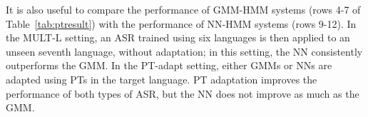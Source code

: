 It is also useful to compare the performance of GMM-HMM systems (rows
4-7 of Table~\ref{tab:ptresult}) with the performance of NN-HMM
systems (rows 9-12).  In the {\sc MULT-L} setting, an ASR trained
using six languages is then applied to an unseen seventh language,
without adaptation; in this setting, the NN consistently outperforms
the GMM.  In the {\sc PT-adapt} setting, either GMMs or NNs are
adapted using PTs in the target language.  PT adaptation improves the
performance of both types of ASR, but the NN does not improve as much
as the GMM.

